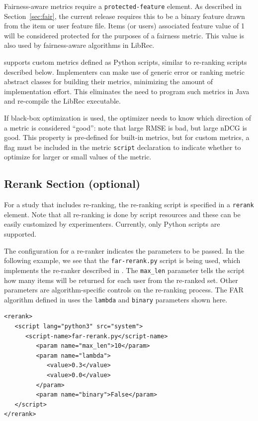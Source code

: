 Fairness-aware metrics require a \texttt{protected-feature} element. As described in Section~\ref{sec:fair}, the current release requires this to be a binary feature drawn from the item or user feature file. Items (or users) associated feature value of 1 will be considered protected for the purposes of a fairness metric. This value is also used by fairness-aware algorithms in LibRec.

\libauto{} supports custom metrics defined as Python scripts, similar to re-ranking scripts described below. Implementers can make use of generic error or ranking metric abstract classes for building their metrics, minimizing the amount of implementation effort. This eliminates the need to program such metrics in Java and re-compile the LibRec executable.

If black-box optimization is used, the optimizer needs to know which direction of a metric is considered ``good'': note that large RMSE is bad, but large nDCG is good. This property is pre-defined for built-in metrics, but for custom metrics, a flag must be included in the metric \texttt{script} declaration to indicate whether to optimize for larger or small values of the metric.  

\subsection{Rerank Section (optional)}
For a study that includes re-ranking, the re-ranking script is specified in a \texttt{rerank} element. Note that all re-ranking is done by script resources and these can be easily customized by experimenters. Currently, only Python scripts are supported.

The configuration for a re-ranker indicates the parameters to be passed. In the following example, we see that the \texttt{far-rerank.py} script is being used, which implements the re-ranker described in \cite{liu2019farpfar}. The \texttt{max\_len} parameter tells the script how many items will be returned for each user from the re-ranked set. Other parameters are algorithm-specific controls on the re-ranking process. The FAR algorithm defined in \cite{liu2019farpfar} uses the \texttt{lambda} and \texttt{binary} parameters shown here.

{\small
\begin{verbatim}
<rerank>
   <script lang="python3" src="system">
      <script-name>far-rerank.py</script-name>
         <param name="max_len">10</param>
         <param name="lambda">
            <value>0.3</value>
            <value>0.0</value>
         </param>
         <param name="binary">False</param>
   </script>
</rerank>
\end{verbatim}}

